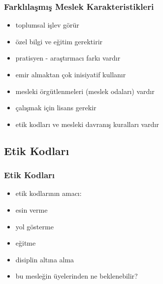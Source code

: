 \documentclass[dvipsnames]{beamer}
\theoremstyle{plain}
\begin{document}
\begin{frame}
  \frametitle{Farklılaşmış Meslek Karakteristikleri}

  \begin{itemize}
    \item toplumsal işlev görür

    \pause
    \medskip
    \item özel bilgi ve eğitim gerektirir
    \item pratisyen - araştırmacı farkı vardır

    \pause
    \medskip
    \item emir almaktan çok inisiyatif kullanır

    \pause
    \medskip
    \item mesleki örgütlenmeleri (meslek odaları) vardır
    \item çalışmak için lisans gerekir

    \pause
    \medskip
    \item etik kodları ve mesleki davranış kuralları vardır
  \end{itemize}
\end{frame}

\subsection{Etik Kodları}

\begin{frame}
  \frametitle{Etik Kodları}

  \begin{itemize}
    \item etik kodlarının amacı:

    \medskip
    \item esin verme
    \item yol gösterme
    \item eğitme
    \item disiplin altına alma

    \pause
    \bigskip
    \item bu mesleğin üyelerinden ne beklenebilir?
  \end{itemize}
\end{frame}

\end{document}
